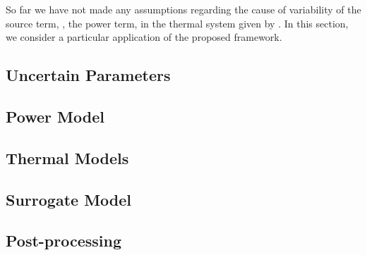 So far we have not made any assumptions regarding the cause of variability of the source term, \ie, the power term, in the thermal system given by .
In this section, we consider a particular application of the proposed framework.



\subsection{Uncertain Parameters} 


\subsection{Power Model} 


\subsection{Thermal Models} 


\subsection{Surrogate Model} 


\subsection{Post-processing} 

